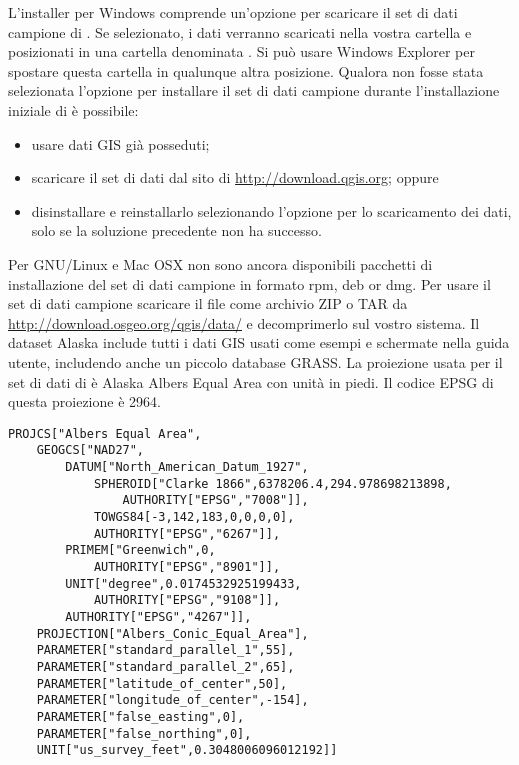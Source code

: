 \win L'installer per Windows comprende un'opzione per scaricare il
set di dati campione di \qg. Se selezionato, i dati verranno scaricati
nella vostra cartella  e posizionati in
una cartella denominata . Si può usare
Windows Explorer per spostare questa cartella in qualunque altra
posizione. Qualora non fosse stata selezionata l'opzione per installare
il set di dati campione durante l'installazione iniziale di \qg è
possibile: 
\begin{itemize}[label=--]
\item usare dati GIS già posseduti; 
\item scaricare il set di dati dal sito di \qg \url{http://download.qgis.org};
oppure 
\item disinstallare \qg e reinstallarlo selezionando l'opzione per lo scaricamento
dei dati, solo se la soluzione precedente non ha successo. 
\end{itemize}

\nix \osx Per GNU/Linux e Mac OSX non sono ancora disponibili pacchetti
di installazione del set di dati campione in formato rpm, deb or dmg.
Per usare il set di dati campione scaricare il file 
come archivio ZIP o TAR da \url{http://download.osgeo.org/qgis/data/}
e decomprimerlo sul vostro sistema. Il dataset Alaska include tutti
i dati GIS usati come esempi e schermate nella guida utente, includendo 
anche un piccolo database GRASS. La proiezione usata per
il set di dati di \qg è Alaska Albers Equal Area con unità in piedi.
Il codice EPSG di questa proiezione è 2964.

\begin{verbatim}
PROJCS["Albers Equal Area",
    GEOGCS["NAD27",
        DATUM["North_American_Datum_1927",
            SPHEROID["Clarke 1866",6378206.4,294.978698213898,
                AUTHORITY["EPSG","7008"]],
            TOWGS84[-3,142,183,0,0,0,0],
            AUTHORITY["EPSG","6267"]],
        PRIMEM["Greenwich",0,
            AUTHORITY["EPSG","8901"]],
        UNIT["degree",0.0174532925199433,
            AUTHORITY["EPSG","9108"]],
        AUTHORITY["EPSG","4267"]],
    PROJECTION["Albers_Conic_Equal_Area"],
    PARAMETER["standard_parallel_1",55],
    PARAMETER["standard_parallel_2",65],
    PARAMETER["latitude_of_center",50],
    PARAMETER["longitude_of_center",-154],
    PARAMETER["false_easting",0],
    PARAMETER["false_northing",0],
    UNIT["us_survey_feet",0.3048006096012192]]
\end{verbatim}

